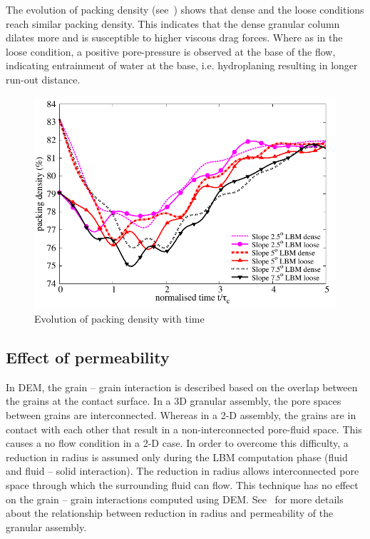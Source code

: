 The evolution of packing density (see~) shows that dense and the loose conditions reach similar packing density. This indicates that the dense granular column dilates more and is susceptible to higher viscous drag forces. Where as in the loose condition, a positive pore-pressure is observed at the base of the flow, indicating entrainment of water at the base, i.e. hydroplaning resulting in longer run-out distance.

\begin{figure}
\centering
\includegraphics[width=0.97\columnwidth]{Voronoi}
\caption{Evolution of packing density with time}
\label{fig:voro}
\end{figure}


\subsection{Effect of permeability}

In DEM, the grain -- grain interaction is described based on the overlap between the grains at the contact surface. In a 3D granular assembly, the pore spaces between grains are interconnected. Whereas in a 2-D assembly, the grains are in contact with each other that result in a non-interconnected pore-fluid space. This causes a no flow condition in a 2-D case. In order to overcome this difficulty, a reduction in radius is assumed only during the LBM computation phase (fluid and fluid -- solid interaction). The reduction in radius allows interconnected pore space through which the surrounding fluid can flow. This technique has no effect on the grain -- grain interactions computed using DEM. See~\citet{Kumar2012} for more details about the relationship between reduction in radius and permeability of the granular assembly.


